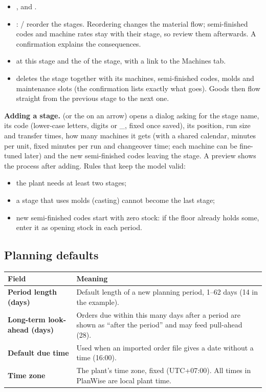 \begin{itemize}
  \item {},  and .
  \item {}: / reorder the stages. Reordering changes the
        material flow; semi-finished codes and machine rates stay with their stage, so review them
        afterwards. A confirmation explains the consequences.
  \item {} at this stage and the  of the stage, with a link to the
        Machines tab.
  \item {} deletes the stage together with its machines, semi-finished codes, molds and
        maintenance slots (the confirmation lists exactly what goes). Goods then flow straight from the
        previous stage to the next one.
\end{itemize}

\textbf{Adding a stage.}  (or the \ui{+} on an arrow) opens a dialog asking for the stage
name, its code (lower-case letters, digits or \_, fixed once saved), its position, run size and transfer
times, how many machines it gets (with a shared calendar, minutes per unit, fixed minutes per run and
changeover time; each machine can be fine-tuned later) and the new semi-finished codes leaving the stage. A
preview shows the process after adding. Rules that keep the model valid:

\begin{itemize}
  \item the plant needs at least two stages;
  \item a stage that uses molds (casting) cannot become the last stage;
  \item new semi-finished codes start with zero stock: if the floor already holds some, enter it as opening
        stock in each period.
\end{itemize}

\subsection{Planning defaults}

\begin{center}
\begin{tabularx}{\linewidth}{>{\bfseries}p{4.3cm}X}
\toprule
\rowcolor{white}Field & Meaning \\
\midrule
Period length (days) & Default length of a new planning period, 1--62 days (14 in the example). \\
Long-term look-ahead (days) & Orders due within this many days after a period are shown as ``after the period'' and may feed pull-ahead (28). \\
Default due time & Used when an imported order file gives a date without a time (16:00). \\
Time zone & The plant's time zone, fixed (UTC+07:00). All times in PlanWise are local plant time. \\
\bottomrule
\end{tabularx}
\end{center}

